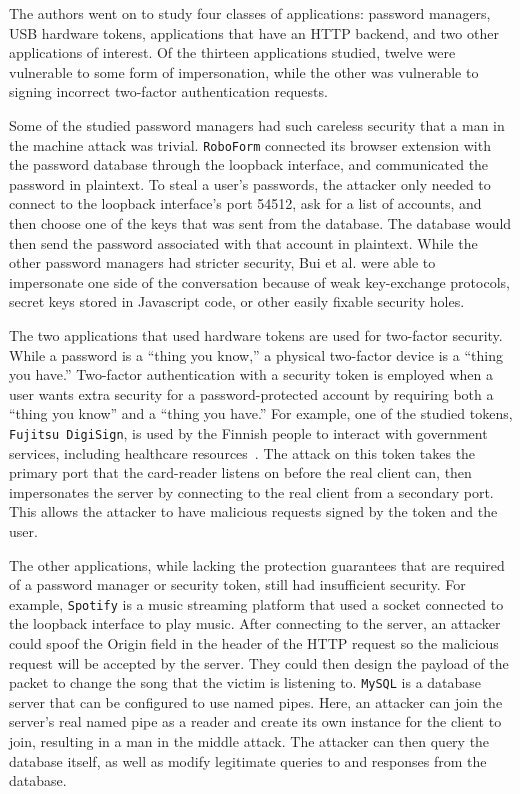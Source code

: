 The authors went on to study four classes of applications: password managers, USB hardware tokens, applications that have an HTTP backend, and two other applications of interest.  Of the thirteen applications studied, twelve were vulnerable to some form of impersonation, while the other was vulnerable to signing incorrect two-factor authentication requests.

Some of the studied password managers had such careless security that a man in the machine attack was trivial.  \texttt{RoboForm} connected its browser extension with the password database through the loopback interface, and communicated the password in plaintext.  To steal a user's passwords, the attacker only needed to connect to the loopback interface's port 54512, ask for a list of accounts, and then choose one of the keys that was sent from the database.  The database would then send the password associated with that account in plaintext.  While the other password managers had stricter security, Bui et al. were able to impersonate one side of the conversation because of weak key-exchange protocols, secret keys stored in Javascript code, or other easily fixable security holes.

The two applications that used hardware tokens are used for two-factor security.  While a password is a ``thing you know,'' a physical two-factor device is a ``thing you have.''  Two-factor authentication with a security token is employed when a user wants extra security for a password-protected account by requiring both a ``thing you know'' and a ``thing you have.''  For example, one of the studied tokens, \texttt{Fujitsu DigiSign}, is used by the Finnish people to interact with government services, including healthcare resources~\cite{MitMa}.  The attack on this token takes the primary port that the card-reader listens on before the real client can, then impersonates the server by connecting to the real client from a secondary port.  This allows the attacker to have malicious requests signed by the token and the user.

The other applications, while lacking the protection guarantees that are required of a password manager or security token, still had insufficient security.  For example, \texttt{Spotify} is a music streaming platform that used a socket connected to the loopback interface to play music.  After connecting to the server, an attacker could spoof the Origin field in the header of the HTTP request so the malicious request will be accepted by the server.  They could then design the payload of the packet to change the song that the victim is listening to.  \texttt{MySQL} is a database server that can be configured to use named pipes.  Here, an attacker can join the server's real named pipe as a reader and create its own instance for the client to join, resulting in a man in the middle attack.  The attacker can then query the database itself, as well as modify legitimate queries to and responses from the database.

